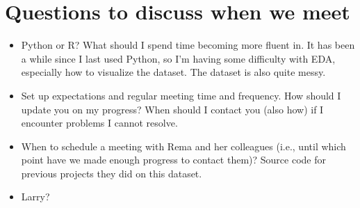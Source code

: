 \documentclass{article}
\begin{document}
\section{Questions to discuss when we meet}
\begin{itemize}
  \item Python or R? What should I spend time becoming more fluent in.
  It has been a while since I last used Python, so I'm having some difficulty with EDA,
  especially how to visualize the dataset. The dataset is also quite messy.
  \item Set up expectations and regular meeting time and frequency.
  How should I update you on my progress? When should I contact you (also how) if
  I encounter problems I cannot resolve.
  \item When to schedule a meeting with Rema and her colleagues (i.e., until which point
  have we made enough progress to contact them)? Source code for previous projects
  they did on this dataset.
  \item Larry?
\end{itemize}
\end{document}
